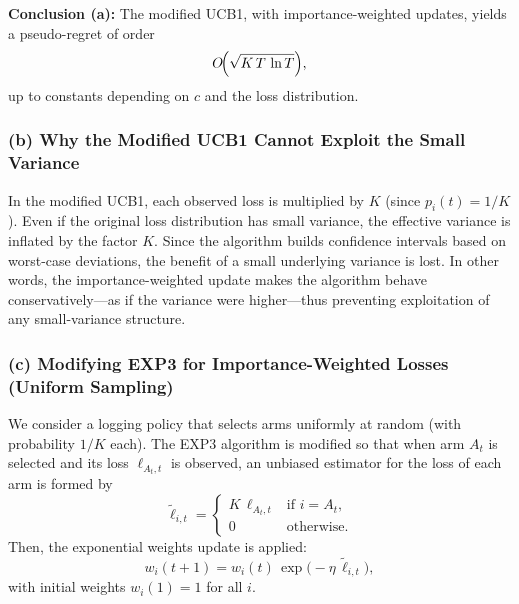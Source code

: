 \medskip
\noindent
\textbf{Conclusion (a):}  
The modified UCB1, with importance-weighted updates, yields a pseudo-regret of order 
\[
  O\!\Bigl(\sqrt{K\,T\,\ln T}\Bigr),
\]
up to constants depending on \(c\) and the loss distribution.

\bigskip
\subsubsection*{(b) Why the Modified UCB1 Cannot Exploit the Small Variance}

In the modified UCB1, each observed loss is multiplied by \(K\) (since \(p_i(t)=1/K\)).  
Even if the original loss distribution has small variance, the effective variance is inflated by the factor \(K\).  
Since the algorithm builds confidence intervals based on worst-case deviations, the benefit of a small underlying variance is lost.  
In other words, the importance-weighted update makes the algorithm behave conservatively—as if the variance were higher—thus preventing exploitation of any small-variance structure.

\bigskip
\subsubsection*{(c) Modifying EXP3 for Importance-Weighted Losses (Uniform Sampling)}

We consider a logging policy that selects arms uniformly at random (with probability \(1/K\) each).  
The EXP3 algorithm is modified so that when arm \(A_t\) is selected and its loss \(\ell_{A_t,t}\) is observed, an unbiased estimator for the loss of each arm is formed by
\[
   \tilde{\ell}_{i,t}=
   \begin{cases}
     K\,\ell_{A_t,t} & \text{if } i=A_t,\\[1mm]
     0 & \text{otherwise.}
   \end{cases}
\]
Then, the exponential weights update is applied:
\[
   w_i(t+1)=w_i(t)\,\exp\bigl(-\eta\,\tilde{\ell}_{i,t}\bigr),
\]
with initial weights \(w_i(1)=1\) for all \(i\).

